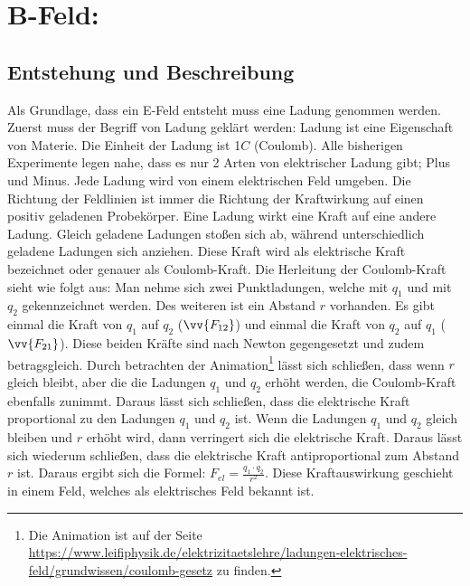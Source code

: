 \section{B-Feld:}
\subsection{Entstehung und Beschreibung}
Als Grundlage, dass ein E-Feld entsteht muss eine Ladung genommen werden.
Zuerst muss der Begriff von Ladung geklärt werden:
Ladung ist eine Eigenschaft von Materie.
Die Einheit der Ladung ist 1$C$ (Coulomb).
Alle bisherigen Experimente legen nahe, dass es nur 2 Arten von elektrischer Ladung gibt; Plus und Minus.
Jede Ladung wird von einem elektrischen Feld umgeben.
Die Richtung der Feldlinien ist immer die Richtung der Kraftwirkung auf einen positiv geladenen Probekörper.
Eine Ladung wirkt eine Kraft auf eine andere Ladung.
Gleich geladene Ladungen stoßen sich ab, während unterschiedlich geladene Ladungen sich anziehen.
Diese Kraft wird als elektrische Kraft bezeichnet oder genauer als Coulomb-Kraft.
Die Herleitung der Coulomb-Kraft sieht wie folgt aus:
Man nehme sich zwei Punktladungen, welche mit $q_1$ und mit $q_2$ gekennzeichnet werden. 
Des weiteren ist ein Abstand $r$ vorhanden.
Es gibt einmal die Kraft von $q_1$ auf $q_2$ ($\vv{F_{12}}$) und einmal die Kraft von $q_2$ auf $q_1$ ($\vv{F_{21}}$).
Diese beiden Kräfte sind nach Newton gegengesetzt und zudem betragsgleich.
Durch betrachten der Animation\footnote{Die Animation ist auf der Seite \url{https://www.leifiphysik.de/elektrizitaetslehre/ladungen-elektrisches-feld/grundwissen/coulomb-gesetz} zu finden.} 
lässt sich schließen, dass wenn $r$ gleich bleibt, aber die die Ladungen $q_1$ und $q_2$ erhöht werden, die Coulomb-Kraft ebenfalls zunimmt.
Daraus lässt sich schließen, dass die elektrische Kraft proportional zu den Ladungen $q_1$ und $q_2$ ist. 
Wenn die Ladungen $q_1$ und $q_2$ gleich bleiben und $r$ erhöht wird, dann verringert sich die elektrische Kraft.
Daraus lässt sich wiederum schließen, dass die elektrische Kraft antiproportional zum Abstand $r$ ist.
Daraus ergibt sich die Formel: $F_{el} = \frac{q_1 \cdot q_2}{r^2}$.
Diese Kraftauswirkung geschieht in einem Feld, welches als elektrisches Feld bekannt ist.

